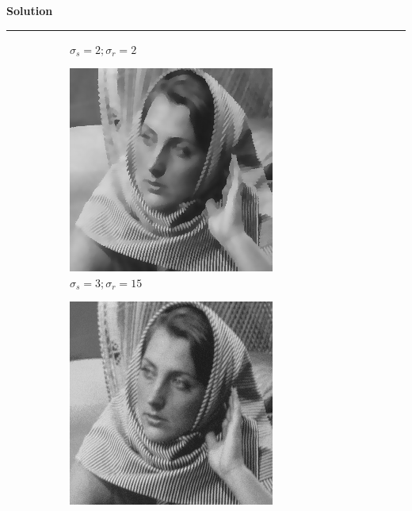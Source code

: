 \documentclass[a4paper]{article}
\newenvironment{solution}[2][]{%
    \begin{mdframed}[linecolor=green!60!black, linewidth=2pt, roundcorner=10pt, backgroundcolor=green!5!white, skipabove=12pt, skipbelow=12pt]%
        \textbf{\large #2} %
        \par\noindent\rule{\textwidth}{0.4pt} %
        \vspace{0.5em} %
}{%
    \end{mdframed}%
}
\begin{document}
\begin{solution}{Solution}
\begin{figure}[H]
\begin{subfigure}[b]{0.24\textwidth}
        \caption{$\sigma_s=2;\sigma_r=2$}
        \label{fig:subfig2}
    \end{subfigure}
    \begin{subfigure}[b]{0.24\textwidth}
        \centering
        \includegraphics[width=\textwidth]{../images/filtered_barbara256_meanshift_sigma_5_sigma_s_3_sigma_r_15.png}
        \caption{$\sigma_s=3;\sigma_r=15$}
        \label{fig:subfig3}
    \end{subfigure}
    \begin{subfigure}[b]{0.24\textwidth}
        \centering
        \includegraphics[width=\textwidth]{../images/filtered_barbara256_meanshift_sigma_5_sigma_s_15_sigma_r_3.png}

\end{subfigure}
\end{figure}
\end{solution}
\end{document}
